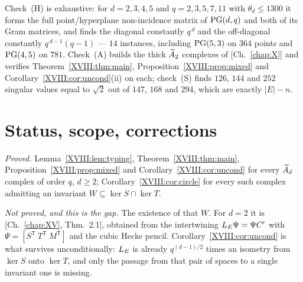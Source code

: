 Check~(H) is exhaustive: for $d=2,3,4,5$ and $q=2,3,5,7,11$ with $\theta_d\le1300$ it
forms the full point/hyperplane non-incidence matrix of $\mathrm{PG}(d,q)$ and both of its Gram
matrices, and finds the diagonal constantly $q^{\,d}$ and the off-diagonal constantly
$q^{\,d-1}(q-1)$ --- $14$ instances, including $\mathrm{PG}(5,3)$ on $364$ points and $\mathrm{PG}(4,5)$ on
$781$. Check~(A) builds the thick $\widetilde A_{2}$ complexes of [Ch.~\ref{chap:X}] and verifies
Theorem~\ref{XVIII:thm:main}, Proposition~\ref{XVIII:prop:mixed} and
Corollary~\ref{XVIII:cor:uncond}(ii) on each; check~(S) finds $126$, $144$ and $252$ singular
values equal to $\sqrt2$ out of $147$, $168$ and $294$, which are exactly $|E|-n$.

\section{Status, scope, corrections}\label{XVIII:sec:scope}

\emph{Proved.} Lemma~\ref{XVIII:lem:typing}, Theorem~\ref{XVIII:thm:main},
Proposition~\ref{XVIII:prop:mixed} and Corollary~\ref{XVIII:cor:uncond} for every $\widetilde A_{d}$ complex
of order $q$, $d\ge2$; Corollary~\ref{XVIII:cor:circle} for every such complex admitting an
invariant $W\subseteq\ker S\cap\ker T$.

\emph{Not proved, and this is the gap.} The existence of that $W$. For $d=2$ it is
[Ch.~\ref{chap:XV}, Thm.~2.1], obtained from the intertwining $L_E\Psi=\Psi C'$ with
$\Psi=[S^{\mathsf T}\ T^{\mathsf T}\ M^{\mathsf T}]$ and the cubic Hecke pencil.
Corollary~\ref{XVIII:cor:uncond} is what survives unconditionally: $L_E$ is already
$q^{(d-1)/2}$ times an isometry from $\ker S$ onto $\ker T$, and only the passage from
that pair of spaces to a single invariant one is missing.


